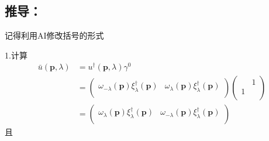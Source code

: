 \section{}



\subsection{}

\subsection{推导：}
记得利用AI修改括号的形式

1.计算
\begin{equation}
    \begin{aligned}
        \bar{u}\left( \mathbf{p},\lambda \right) &=u^{\dagger}\left( \mathbf{p},\lambda \right) \gamma ^0
\\
&=\left( \begin{matrix}
	\omega _{-\lambda}\left( \mathbf{p} \right) \xi _{\lambda}^{\dagger}\left( \mathbf{p} \right)&		\omega _{\lambda}\left( \mathbf{p} \right) \xi _{\lambda}^{\dagger}\left( \mathbf{p} \right)\\
\end{matrix} \right) \left( \begin{matrix}
	&		1\\
	1&		\\
\end{matrix} \right) 
\\
&=\left( \begin{matrix}
	\omega _{\lambda}\left( \mathbf{p} \right) \xi _{\lambda}^{\dagger}\left( \mathbf{p} \right)&		\omega _{-\lambda}\left( \mathbf{p} \right) \xi _{\lambda}^{\dagger}\left( \mathbf{p} \right)\\
\end{matrix} \right) 
    \end{aligned}
\end{equation}
且
